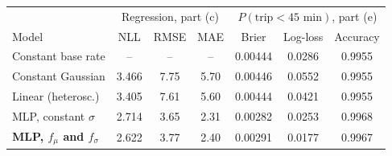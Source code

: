 \begin{tabular}{lccc|ccc}
\toprule
 & \multicolumn{3}{c|}{Regression, part (c)} & \multicolumn{3}{c}{$P(\text{trip}<45\text{ min})$, part (e)} \\
Model & NLL & RMSE & MAE & Brier & Log-loss & Accuracy \\
\midrule
Constant base rate & -- & -- & -- & 0.00444 & 0.0286 & 0.9955 \\
Constant Gaussian & 3.466 & 7.75 & 5.70 & 0.00446 & 0.0552 & 0.9955 \\
Linear (heterosc.) & 3.405 & 7.61 & 5.60 & 0.00444 & 0.0421 & 0.9955 \\
MLP, constant $\sigma$ & 2.714 & 3.65 & 2.31 & 0.00282 & 0.0253 & 0.9968 \\
\textbf{MLP, $f_\mu$ and $f_\sigma$} & 2.622 & 3.77 & 2.40 & 0.00291 & 0.0177 & 0.9967 \\
\bottomrule
\end{tabular}
